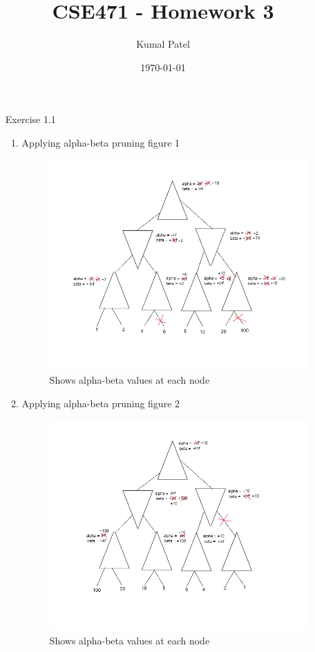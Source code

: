 \documentclass[letterpaper, 12pt]{article}
\title{CSE471 - Homework 3}
\author{Kumal Patel}
\date{\today}
\begin{document}
   
\maketitle

\begin{enumerate}
    \item[Exercise 1.1] 
    \begin{enumerate}
        
        \item Applying alpha-beta pruning figure 1 \\
        \begin{figure}[H]
            \centering
            \includegraphics[width=\linewidth]{q1.a.png}
            \caption{Shows alpha-beta values at each node}
        \end{figure}

        \item Applying alpha-beta pruning figure 2 \\
        \begin{figure}[H]
            \centering
            \includegraphics[width=\linewidth]{q1.b.png}
            \caption{Shows alpha-beta values at each node}
        \end{figure} 


\end{enumerate}
\end{enumerate}
\end{document}
